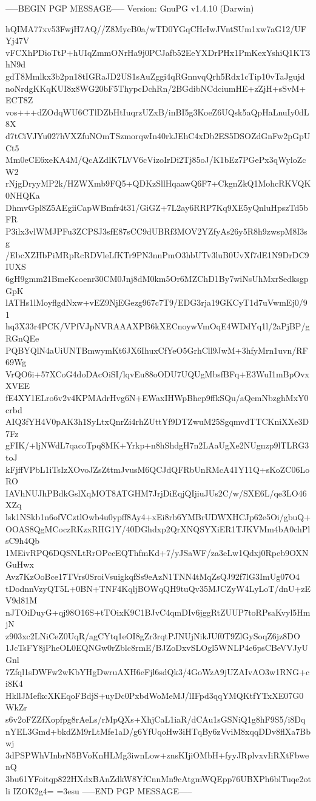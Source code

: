 -----BEGIN PGP MESSAGE-----
Version: GnuPG v1.4.10 (Darwin)

hQIMA77xv53FwjH7AQ//Z8MycB0a/wTD0YGqCHcIwJVntSUm1xw7aG12/UFYj47V
vFCXhPDioTtP+hUIqZmmONrHa9j0PCJafb52EeYXDrPHx1PmKexYshiQ1KT3hN9d
gdT8Mmlkx3b2pn18tIGRaJD2US1sAuZggi4qRGnnvqQrh5Rdx1cTip10vTaJgujd
noNrdgKKqKUI8x8WG20bF5ThypcDchRn/2BGdibNCdciumHE+zZjH+sSvM+ECT8Z
vos+++dZOdqWU6CTlDZbHtIuqrzUZxB/inBI5g3KoeZ6UQsk5aQpHaLnuIy0dL8X
d7tCiVJYu027hVXZfuNOmTSzmorqwIn40rkJEhC4xDb2ES5DSOZdGnFw2pGpUCt5
Mm0eCE6xeKA4M/QcAZdlK7LVV6cVizoIrDi2Tj85oJ/K1bEz7PGePx3qWyloZcW2
rNjgDryyMP2k/HZWXmb9FQ5+QDKzSllHqaawQ6F7+CkgnZkQ1MohcRKVQK0NHQKa
DhmvGpl8Z5AEgiiCapWBmfr4t31/GiGZ+7L2ay6RRP7Kq9XE5yQnluHpszTd5bFR
P3ilx3vlWMJPFu3ZCPSJ3sfE87sCC9dUBRf3MOV2YZfyAs26y5R8h9zwspM8I3sg
/EbcXZHbPiMRpRcRDVleLfKTr9PN3nnPmO3hbUTv3luB0UvXf7dE1N9DrDC9IUXS
6gH9gmm21BmeKcoenr30CM0Jnj8dM0km5Or6MZChD1By7wiNsUhMxrSedksgpGpK
lATHs1lMoyflgdNxw+vEZ9NjEGezg967c7T9/EDG3rja19GKCyT1d7uVwmEj0/91
hq3X33r4PCK/VPfVJpNVRAAAXPB6kXECnoywVmOqE4WDdYq1l/2aPjBP/gRGnQEe
PQBYQlN4aUiUNTBmwymKt6JX6IhuxCfYeO5GrhCll9JwM+3hfyMrn1uvn/RF69Wg
VrQO6i+57XCoG4doDAcOiSI/lqvEu88oODU7UQUgMbsfBFq+E3WuI1mBpOvxXVEE
fE4XY1ELro6v2v4KPMAdrHvg6N+EWaxIHWpBhep9ffkSQu/aQemNbzghMxY0crbd
AIQ3fYH4V0pAK3h1SyLtxQnrZi4rhZUttYf9DTZwuM25SgqmvdTTCKniXXe3D7Fz
gFIK/+ljNWdL7qacoTpq8MK+Yrkp+n8hShdgH7n2LAaUgXe2NUgnzp9lTLRG3toJ
kFjffVPbL1iTsIzXOvoJZsZttmJvusM6QCJdQFRbUnRMcA41Y11Q+sKoZC06LoRO
IAVhNUJhPBdkGslXqMOT8ATGHM7JrjDiEqjQIjiuJUs2C/w/SXE6L/qe3LO46XZq
lsk1NSkb1n6ofVCztlOwb4u0ypff8Ay4+xEi8rb6YMBrUDWXHCJp62e5Oi/gbuQ+
OOAS8QgMCoczRKzxRHG1Y/40DGhdxp2QrXNQSYXiER1TJKVMm4bA0chPlsC9h4Qb
1MEivRPQ6DQSNLtRrOPccEQThfmKd+7/yJSaWF/za3eLw1Qdxj0Rpeb9OXNGuHwx
Avz7KzOoBce17TVrs0SroiVsuigkqfSs9eAzN1TNN4tMqZsQJ92f7lG3ImUg07O4
tDodnnVzyQT5L+0BN+TNF4KqljBOWqQH9tuQv35MJCZyW4LyLoT/dnU+zEV9d81M
nJTOiDuyG+qj98O16S+tTOixK9C1BJvC4qmDIv6jggRtZUUP7toRPsaKvyl5HmjN
z903xc2LNiCeZ0UqR/agCYtq1eOI8gZr3rqtPJNUjNikJUf0T9ZlGySoqZ6jz8DO
1JcTsFY8jPheOL0EQNGw0rZblc8rmE/BJZoDxvSLOgl5WNLP4e6psCBeVVJyUGnl
7Zfql1sDWFw2wKbYHgDwruAXH6eFjl6sdQk3/4GoWzA9jUZAIvAO3w1RNG+ci8K4
HkllJMefkcXKEqoFBdjS+uyDc0PxbdWoMeMJ/lIFpd3qqYMQKtfYTxXE07G0WkZr
s6v2oFZZfXopfpg8rAeLs/rMpQXs+XhjCaL1iaR/dCAu1sGSNiQ1g8hF9S5/i8Dq
nYEL3Gmd+bkdZM9rLtMfe1aD/g6YfUqoHw3iHTqBy6zVviM8xqqDDv8flXa7Bbwj
3dPSPWhVInbrN5BVoKnHLMg3iwnLow+znsKIjiOMbH+fyyJRplvxvIiRXtFbwenQ
3bu61YFoitqp822HXdxBAnZdkW8YfCnnMn9cAtgmWQEpp76UBXPh6blTuqe2otli
IZOK2g4=
=3esu
-----END PGP MESSAGE-----
